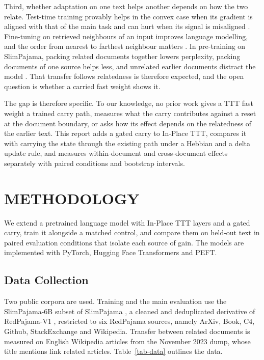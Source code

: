 \documentclass[12pt,a4paper]{report}
\begin{document}
Third, whether adaptation on one text helps another depends on how the two relate. Test-time training provably helps in the convex case when its gradient is aligned with that of the main task \citep{sun2020ttt} and can hurt when its signal is misaligned \citep{gandelsman2022ttt}. Fine-tuning on retrieved neighbours of an input improves language modelling, and the order from nearest to farthest neighbour matters \citep{hardt2024test}. In pre-training on SlimPajama, packing related documents together lowers perplexity, packing documents of one source helps less, and unrelated earlier documents distract the model \citep{zhao2024analysing}. That transfer follows relatedness is therefore expected, and the open question is whether a carried fast weight shows it.

The gap is therefore specific. To our knowledge, no prior work gives a TTT fast weight a trained carry path, measures what the carry contributes against a reset at the document boundary, or asks how its effect depends on the relatedness of the earlier text. This report adds a gated carry to In-Place TTT, compares it with carrying the state through the existing path under a Hebbian and a delta update rule, and measures within-document and cross-document effects separately with paired conditions and bootstrap intervals.

\chapter{METHODOLOGY}
\label{ch-method}
\label{ch-eval}

We extend a pretrained language model with In-Place TTT layers and a gated carry, train it alongside a matched control, and compare them on held-out text in paired evaluation conditions that isolate each source of gain. The models are implemented with PyTorch, Hugging Face Transformers and PEFT.

\section{Data Collection}

Two public corpora are used. Training and the main evaluation use the SlimPajama-6B subset \citep{yoon2023slimpajama6b} of SlimPajama \citep{soboleva2023slimpajama}, a cleaned and deduplicated derivative of RedPajama-V1 \citep{weber2024redpajama}, restricted to six RedPajama sources, namely ArXiv, Book, C4, Github, StackExchange and Wikipedia. Transfer between related documents is measured on English Wikipedia articles from the November 2023 dump, whose title mentions link related articles. Table~\ref{tab-data} outlines the data.
\end{document}
